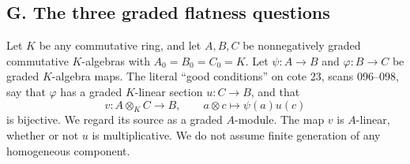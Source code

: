 \subsection{G. The three graded flatness questions}

Let $K$ be any commutative ring, and let $A,B,C$ be nonnegatively graded
commutative $K$-algebras with $A_0=B_0=C_0=K$.  Let
$\psi:A\to B$ and $\varphi:B\to C$ be graded $K$-algebra maps.
The literal ``good conditions'' on cote 23, scans 096--098, say that
$\varphi$ has a graded $K$-linear section $u:C\to B$, and that
\[
 v:A\otimes_K C\longrightarrow B,\qquad
 a\otimes c\longmapsto\psi(a)u(c)
\]
is bijective.  We regard its source as a graded $A$-module.  The map $v$
is $A$-linear, whether or not $u$ is multiplicative.  We do not assume
finite generation of any homogeneous component.

